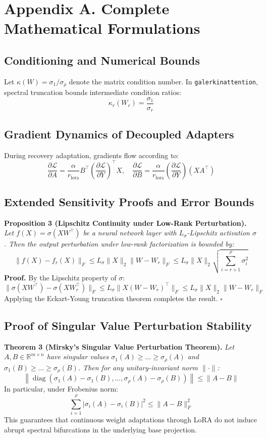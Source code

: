 \section*{Appendix A. Complete Mathematical Formulations}

\subsection*{Conditioning and Numerical Bounds}
Let $\kappa(W) = \sigma_1 / \sigma_\rho$ denote the matrix condition number. In \texttt{galerkinattention}, spectral truncation bounds intermediate condition ratios:
\[
\kappa_r(W_r) = \frac{\sigma_1}{\sigma_r}
\]

\subsection*{Gradient Dynamics of Decoupled Adapters}
During recovery adaptation, gradients flow according to:
\[
\frac{\partial \mathcal{L}}{\partial A} = \frac{\alpha}{r_{\text{lora}}} B^\top \left( \frac{\partial \mathcal{L}}{\partial Y} \right)^\top X, \quad \frac{\partial \mathcal{L}}{\partial B} = \frac{\alpha}{r_{\text{lora}}} \left( \frac{\partial \mathcal{L}}{\partial Y} \right) (X A^\top)
\]

\subsection*{Extended Sensitivity Proofs and Error Bounds}
\textbf{Proposition 3 (Lipschitz Continuity under Low-Rank Perturbation).} \textit{Let $f(X) = \sigma(X W^\top)$ be a neural network layer with $L_\sigma$-Lipschitz activation $\sigma$. Then the output perturbation under low-rank factorization is bounded by:}
\[
\|f(X) - f_r(X)\|_F \le L_\sigma \|X\|_2 \|W - W_r\|_F \le L_\sigma \|X\|_2 \sqrt{\sum_{i=r+1}^\rho \sigma_i^2}
\]
\textbf{Proof.} By the Lipschitz property of $\sigma$:
\[
\|\sigma(X W^\top) - \sigma(X W_r^\top)\|_F \le L_\sigma \|X (W - W_r)^\top\|_F \le L_\sigma \|X\|_2 \|W - W_r\|_F
\]
Applying the Eckart-Young truncation theorem completes the result. $\square$

\subsection*{Proof of Singular Value Perturbation Stability}
\textbf{Theorem 3 (Mirsky's Singular Value Perturbation Theorem).} \textit{Let $A, B \in \mathbb{R}^{m \times n}$ have singular values $\sigma_1(A) \ge \dots \ge \sigma_\rho(A)$ and $\sigma_1(B) \ge \dots \ge \sigma_\rho(B)$. Then for any unitary-invariant norm $\|\cdot\|$:}
\[
\left\| \operatorname{diag}(\sigma_1(A) - \sigma_1(B), \dots, \sigma_\rho(A) - \sigma_\rho(B)) \right\| \le \|A - B\|
\]
In particular, under Frobenius norm:
\[
\sum_{i=1}^\rho |\sigma_i(A) - \sigma_i(B)|^2 \le \|A - B\|_F^2
\]
This guarantees that continuous weight adaptations through LoRA do not induce abrupt spectral bifurcations in the underlying base projection.

